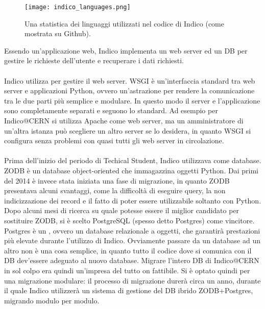		\begin{figure}[h!]
			\begin{center}
				\texttt{[image: indico\_languages.png]}
			\end{center}
			\caption[Linguaggi di Indico]{Una statistica dei linguaggi utilizzati nel codice di Indico (come mostrata su Github).}
			\label{fig:indico_languages}
		\end{figure}
		\noindent
		Essendo un'applicazione web, Indico implementa un web server ed un \ac{DB} per gestire le richieste dell'utente e recuperare i dati richiesti.\\
		\\
		Indico utilizza  per gestire il web server. \ac{WSGI} è un'interfaccia standard tra web server e applicazioni Python, ovvero un'astrazione per rendere la comunicazione tra le due parti più semplice e modulare. In questo modo il server e  l'applicazione sono completamente separati e seguono lo standard. Ad esempio per Indico@CERN si utilizza Apache come web server, ma un amministratore di un'altra istanza può scegliere un altro server se lo desidera, in quanto \ac{WSGI} si configura senza problemi con quasi tutti gli web server in circolazione. \cite{indico:wsgi}\\
		\\
		Prima dell'inizio del periodo di Techical Student, Indico utilizzava  come database. \ac{ZODB} è un database object-oriented che immagazzina oggetti Python. Dai primi del 2014 è invece stata iniziata una fase di migrazione, in  quanto \ac{ZODB} presentava alcuni svantaggi, come la difficoltà di eseguire query, la non indicizzazione dei record e il fatto di poter essere utilizzabile soltanto con Python. Dopo alcuni mesi di ricerca su quale potesse essere il miglior candidato per sostituire \ac{ZODB}, si è scelto PostgreSQL (spesso detto Postgres) come vincitore. Postgres è un , ovvero un database relazionale a oggetti, che garantirà prestazioni più elevate durante l'utilizzo di Indico. Ovviamente passare da un database ad un altro non è una cosa semplice, in quanto tutto il codice dove si comunica con il \ac{DB} dev'essere adeguato al nuovo database. Migrare l'intero \ac{DB} di Indico@CERN in sol colpo era quindi un'impresa del tutto on fattibile. Si è optato quindi per una migrazione modulare: il processo di migrazione durerà circa un anno, durante il quale Indico utilizzerà un sistema di gestione del \ac{DB} ibrido \ac{ZODB}+Postgres, migrando modulo per modulo. \cite{indico:zodb}\cite{pedro:chep}\\
